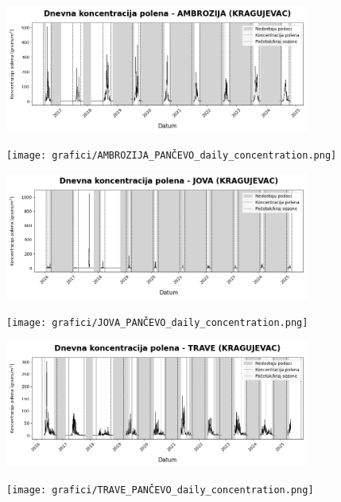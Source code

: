 \documentclass[12pt]{article}
\begin{document}
\begin{center}

\includegraphics[width=0.75\textwidth]{grafici/AMBROZIJA_KRAGUJEVAC_daily_concentration.png}
\vspace{0.5cm}

\texttt{[image: grafici/AMBROZIJA\_PANČEVO\_daily\_concentration.png]}
\vspace{0.5cm}

\includegraphics[width=0.75\textwidth]{grafici/JOVA_KRAGUJEVAC_daily_concentration.png}
\vspace{0.5cm}

\texttt{[image: grafici/JOVA\_PANČEVO\_daily\_concentration.png]}
\vspace{0.5cm}

\includegraphics[width=0.75\textwidth]{grafici/TRAVE_KRAGUJEVAC_daily_concentration.png}
\vspace{0.5cm}

\texttt{[image: grafici/TRAVE\_PANČEVO\_daily\_concentration.png]}
\vspace{0.5cm}

\label{fig:subplots_3x2_all}

\end{center}
\end{document}
